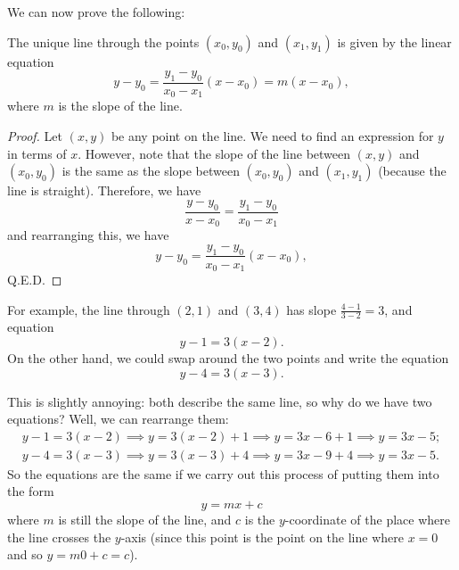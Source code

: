 We can now prove the following:

\begin{thm}
  The unique line through the points $ (x_0, y_0) $ and $ (x_1, y_1) $ is given by the linear equation
  \begin{displaymath}
    y - y_0 = \frac{y_1 - y_0}{x_0 - x_1} (x - x_0) = m(x - x_0),
  \end{displaymath}
  where $ m $ is the slope of the line.
\end{thm}
\begin{proof}
  Let $ (x,y) $ be any point on the line. We need to find an expression for $ y $ in terms of $ x $. However, note that the slope of the
  line between $ (x,y) $ and $ (x_0,y_0) $ is the same as the slope between $ (x_0,y_0) $ and $ (x_1, y_1) $ (because the line is straight).
  Therefore, we have
  \begin{displaymath}
    \frac{y - y_0}{x - x_0} = \frac{y_1 - y_0}{x_0 - x_1}
  \end{displaymath}
  and rearranging this, we have
  \begin{displaymath}
    y - y_0 = \frac{y_1 - y_0}{x_0 - x_1}(x - x_0),
  \end{displaymath}
  Q.E.D.
\end{proof}

For example, the line through $ (2,1) $ and $ (3,4) $ has slope $ \frac{4 - 1}{3 - 2} = 3 $, and equation
\begin{displaymath}
  y - 1 = 3(x - 2).
\end{displaymath}
On the other hand, we could swap around the two points and write the equation
\begin{displaymath}
  y - 4 = 3(x - 3).
\end{displaymath}

This is slightly annoying: both describe the same line, so why do we have two equations? Well, we can rearrange them:
\begin{gather*}
  y - 1 = 3(x - 2) \implies y = 3(x - 2) + 1 \implies y = 3x - 6 + 1 \implies y = 3x - 5;\\
  y - 4 = 3(x - 3) \implies y = 3(x - 3) + 4 \implies y = 3x - 9 + 4 \implies y = 3x - 5.
\end{gather*}
So the equations are the same if we carry out this process of putting them into the form
\begin{displaymath}
  y = mx + c
\end{displaymath}
where $ m $ is still the slope of the line, and $ c $ is the $ y$-coordinate of the place where the line crosses the $ y$-axis (since
this point is the point on the line where $ x = 0 $ and so $ y = m0 + c = c $).

